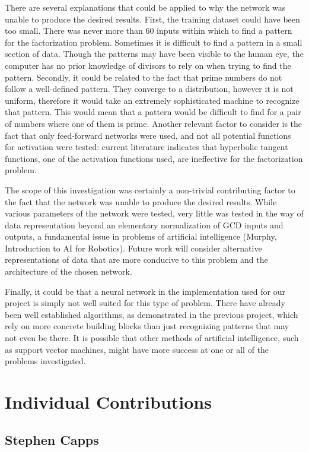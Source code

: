 \documentclass[11pt]{article}
\begin{document}
\indent There are several explanations that could be applied to why the network was unable to produce the desired results.  First, the training dataset could have been too small.  There was never more than 60 inputs within which to find a pattern for the factorization problem. Sometimes it is difficult to find a pattern in a small section of data.  Though the patterns may have been visible to the human eye, the computer has no prior knowledge of divisors to rely on when trying to find the pattern.  Secondly, it could be related to the fact that prime numbers do not follow a well-defined pattern.  They converge to a distribution, however it is not uniform, therefore it would take an extremely sophisticated machine to recognize that pattern.  This would mean that a pattern would be difficult to find for a pair of numbers where one of them is prime. Another relevant factor to consider is the fact that only feed-forward networks were used, and not all potential functions for activation were tested: current literature indicates that hyperbolic tangent functions, one of the activation functions used, are ineffective for the factorization problem. 

\indent The scope of this investigation was certainly a non-trivial contributing factor to the fact that the network was unable to produce the desired results. While various parameters of the network were tested, very little was tested in the way of data representation beyond an elementary normalization of GCD inputs and outputs, a fundamental issue in problems of artificial intelligence (Murphy, Introduction to AI for Robotics). Future work will consider alternative representations of data that are more conducive to this problem and the architecture of the chosen network. 

\indent Finally, it could be that a neural network in the implementation used for our project is simply not well suited for this type of problem.  There have already been well established algorithms, as demonstrated in the previous project, which rely on more concrete building blocks than just recognizing patterns that may not even be there. It is possible that other methods of artificial intelligence, such as support vector machines, might have more success at one or all of the problems investigated. 
\indent  
\section{Individual Contributions}
\subsection{Stephen Capps}$ $
\indent 
\end{document}
